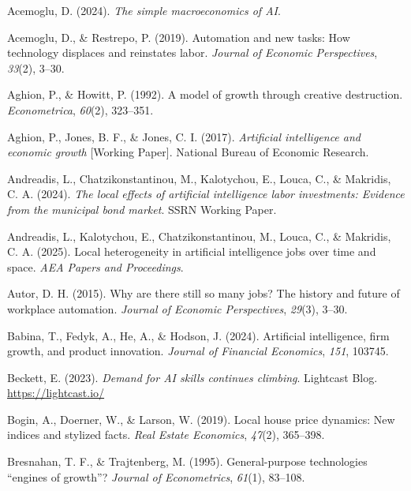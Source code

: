 \documentclass[
]{article}
\newlength{\cslhangindent}
\newenvironment{CSLReferences}[2] %
 {\begin{list}{}{%
  \setlength{\itemindent}{0pt}
  \setlength{\leftmargin}{0pt}
  \setlength{\parsep}{0pt}
  \ifodd #1
   \setlength{\leftmargin}{\cslhangindent}
   \setlength{\itemindent}{-1\cslhangindent}
  \fi
  \setlength{\itemsep}{#2\baselineskip}}}
 {\end{list}}
\begin{document}
\label{refs}
\begin{CSLReferences}{1}{0}
Acemoglu, D. (2024). \emph{The simple macroeconomics of AI}.

Acemoglu, D., \& Restrepo, P. (2019). Automation and new tasks: How
technology displaces and reinstates labor. \emph{Journal of Economic
Perspectives}, \emph{33}(2), 3--30.

Aghion, P., \& Howitt, P. (1992). A model of growth through creative
destruction. \emph{Econometrica}, \emph{60}(2), 323--351.

Aghion, P., Jones, B. F., \& Jones, C. I. (2017). \emph{Artificial
intelligence and economic growth} {[}Working Paper{]}. National Bureau
of Economic Research.

Andreadis, L., Chatzikonstantinou, M., Kalotychou, E., Louca, C., \&
Makridis, C. A. (2024). \emph{The local effects of artificial
intelligence labor investments: Evidence from the municipal bond
market}. SSRN Working Paper.

Andreadis, L., Kalotychou, E., Chatzikonstantinou, M., Louca, C., \&
Makridis, C. A. (2025). Local heterogeneity in artificial intelligence
jobs over time and space. \emph{AEA Papers and Proceedings}.

Autor, D. H. (2015). Why are there still so many jobs? The history and
future of workplace automation. \emph{Journal of Economic Perspectives},
\emph{29}(3), 3--30.

Babina, T., Fedyk, A., He, A., \& Hodson, J. (2024). Artificial
intelligence, firm growth, and product innovation. \emph{Journal of
Financial Economics}, \emph{151}, 103745.

Beckett, E. (2023). \emph{Demand for AI skills continues climbing}.
Lightcast Blog. \url{https://lightcast.io/}

Bogin, A., Doerner, W., \& Larson, W. (2019). Local house price
dynamics: New indices and stylized facts. \emph{Real Estate Economics},
\emph{47}(2), 365--398.

Bresnahan, T. F., \& Trajtenberg, M. (1995). General-purpose
technologies {``engines of growth''}? \emph{Journal of Econometrics},
\emph{61}(1), 83--108.


\end{CSLReferences}
\end{document}
